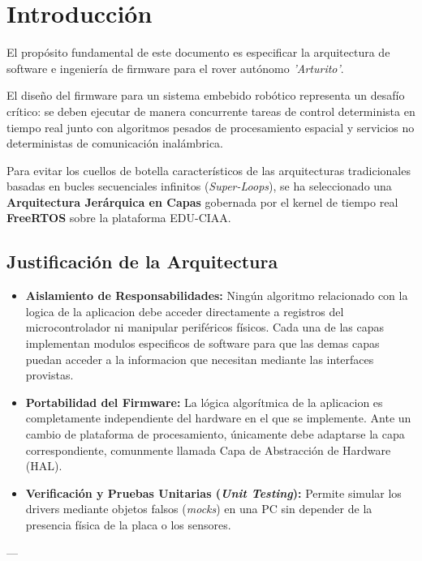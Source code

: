\documentclass[12pt,a4paper]{article}
\begin{document}
\section{Introducción}

El propósito fundamental de este documento es especificar la arquitectura de software e ingeniería de firmware para el rover autónomo \textit{'Arturito'}.

El diseño del firmware para un sistema embebido robótico representa un desafío crítico: se deben ejecutar de manera concurrente tareas de control determinista en tiempo real junto con algoritmos pesados de procesamiento espacial y servicios no deterministas de comunicación inalámbrica.

Para evitar los cuellos de botella característicos de las arquitecturas tradicionales basadas en bucles secuenciales infinitos (\textit{Super-Loops}), se ha seleccionado una \textbf{Arquitectura Jerárquica en Capas} gobernada por el kernel de tiempo real \textbf{FreeRTOS} sobre la plataforma EDU-CIAA.

\subsection{Justificación de la Arquitectura}

\begin{itemize}
    \item \textbf{Aislamiento de Responsabilidades:} Ningún algoritmo relacionado con la logica de la aplicacion debe acceder directamente a registros del microcontrolador ni manipular periféricos físicos. Cada una de las capas implementan modulos especificos de software para que las demas capas puedan acceder a la informacion que necesitan mediante las interfaces provistas.
    \item \textbf{Portabilidad del Firmware:} La lógica algorítmica de la aplicacion es completamente independiente del hardware en el que se implemente. Ante un cambio de plataforma de procesamiento, únicamente debe adaptarse la capa correspondiente, comunmente llamada Capa de Abstracción de Hardware (HAL).
    \item \textbf{Verificación y Pruebas Unitarias (\textit{Unit Testing}):} Permite simular los drivers mediante objetos falsos (\textit{mocks}) en una PC sin depender de la presencia física de la placa o los sensores.
\end{itemize}

---

\newpage
\end{document}

